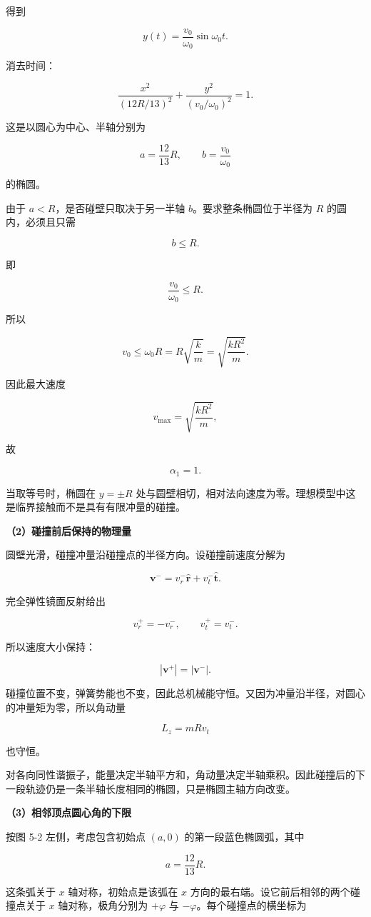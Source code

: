 \documentclass[12pt,a4paper,UTF8]{ctexart}
\begin{document}
得到

\[
y(t)=\frac{v_0}{\omega_0}\sin\omega_0t.
\]

消去时间：

\[
\boxed{
\frac{x^2}{(12R/13)^2}+
\frac{y^2}{(v_0/\omega_0)^2}=1
}.
\]

这是以圆心为中心、半轴分别为

\[a=\frac{12}{13}R,\qquad b=\frac{v_0}{\omega_0}\]

的椭圆。

由于 \(a<R\)，是否碰壁只取决于另一半轴 \(b\)。要求整条椭圆位于半径为
\(R\) 的圆内，必须且只需

\[b\le R.\]

即

\[
\frac{v_0}{\omega_0}\le R.
\]

所以

\[
v_0\le\omega_0R
=R\sqrt{\frac{k}{m}}
=\sqrt{\frac{kR^2}{m}}.
\]

因此最大速度

\[
v_{\max}=\sqrt{\frac{kR^2}{m}},
\]

故

\[
\boxed{\alpha_1=1}.
\]

当取等号时，椭圆在 \(y=\pm R\)
处与圆壁相切，相对法向速度为零。理想模型中这是临界接触而不是具有有限冲量的碰撞。

\textbf{（2）碰撞前后保持的物理量}

圆壁光滑，碰撞冲量沿碰撞点的半径方向。设碰撞前速度分解为

\[\bm v^- =v_r^-\hat{\bm r}+v_t^-\hat{\bm t}.\]

完全弹性镜面反射给出

\[
v_r^+=-v_r^-,\qquad v_t^+=v_t^-.
\]

所以速度大小保持：

\[|\bm v^+|=|\bm v^-|.\]

碰撞位置不变，弹簧势能也不变，因此总机械能守恒。又因为冲量沿半径，对圆心的冲量矩为零，所以角动量

\[L_z=mRv_t\]

也守恒。

对各向同性谐振子，能量决定半轴平方和，角动量决定半轴乘积。因此碰撞后的下一段轨迹仍是一条半轴长度相同的椭圆，只是椭圆主轴方向改变。

\textbf{（3）相邻顶点圆心角的下限}

按图 5-2 左侧，考虑包含初始点 \((a,0)\) 的第一段蓝色椭圆弧，其中

\[a=\frac{12}{13}R.\]

这条弧关于 \(x\) 轴对称，初始点是该弧在 \(x\)
方向的最右端。设它前后相邻的两个碰撞点关于 \(x\) 轴对称，极角分别为
\(+\varphi\) 与 \(-\varphi\)。每个碰撞点的横坐标为
\end{document}
